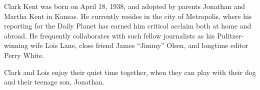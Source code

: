 \begin{vita}
Clark Kent was born on April 18, 1938, and adopted by parents Jonathan and Martha Kent in Kansas. He currently resides in the city of Metropolis, where his reporting for the Daily Planet has earned him critical acclaim both at home and abroad. He frequently collaborates with such fellow journalists as his Pulitzer-winning wife Lois Lane, close friend James ``Jimmy'' Olsen,  and longtime editor Perry White.

Clark and Lois enjoy their quiet time together, when they can play with their dog and their teenage son, Jonathan.
\end{vita}